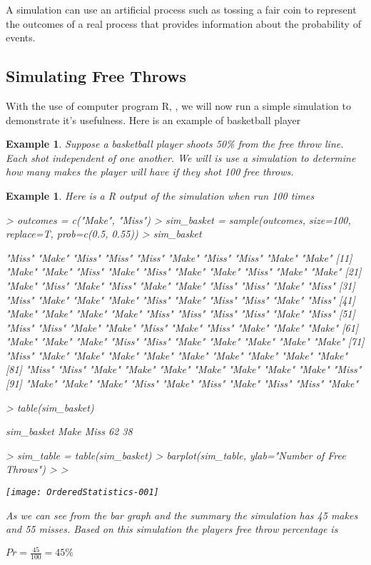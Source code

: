 \documentclass[11pt,a4paper]{article}
\theoremstyle{plain}
\newtheorem{exmp}[fact]{Example}
\begin{document}
A simulation can use an artificial process such as tossing a fair coin to represent the outcomes of a real process that provides information about the probability of events.



\subsection{Simulating Free Throws}
With the use  of computer program R, , we will now run a simple simulation to demonstrate it's usefulness. Here is an example of basketball player



\begin{exmp}
Suppose a basketball player shoots  50\% from the free throw line. Each shot independent of one another. We will is  use a simulation to determine how many makes the player will have if they shot 100 free throws.
\end{exmp}

\begin{exmp}
Here is a R output of the simulation when run 100 times
\begin{Schunk}
\begin{Sinput}
> outcomes = c("Make", "Miss")
> sim_basket = sample(outcomes, size=100, replace=T, prob=c(0.5, 0.55))
> sim_basket
\end{Sinput}
\begin{Soutput}
  [1] "Miss" "Make" "Miss" "Miss" "Miss" "Make" "Miss" "Miss" "Make" "Make"
 [11] "Make" "Make" "Miss" "Make" "Miss" "Make" "Make" "Miss" "Make" "Make"
 [21] "Make" "Miss" "Make" "Miss" "Make" "Make" "Miss" "Miss" "Make" "Miss"
 [31] "Miss" "Make" "Make" "Make" "Miss" "Make" "Miss" "Miss" "Make" "Miss"
 [41] "Make" "Make" "Make" "Make" "Miss" "Miss" "Miss" "Miss" "Make" "Miss"
 [51] "Miss" "Miss" "Make" "Make" "Miss" "Make" "Miss" "Make" "Make" "Make"
 [61] "Make" "Make" "Make" "Miss" "Miss" "Make" "Make" "Make" "Make" "Make"
 [71] "Miss" "Make" "Make" "Make" "Make" "Make" "Make" "Make" "Make" "Make"
 [81] "Miss" "Miss" "Make" "Make" "Make" "Make" "Make" "Make" "Make" "Miss"
 [91] "Make" "Make" "Make" "Miss" "Make" "Miss" "Make" "Miss" "Miss" "Make"
\end{Soutput}
\begin{Sinput}
> table(sim_basket)
\end{Sinput}
\begin{Soutput}
sim_basket
Make Miss 
  62   38 
\end{Soutput}
\begin{Sinput}
> sim_table = table(sim_basket)
> barplot(sim_table, ylab="Number of Free Throws")
> 
> 
\end{Sinput}
\end{Schunk}
\texttt{[image: OrderedStatistics-001]}

As we can see from the bar graph and the summary the simulation has 45 makes and 55 misses. Based on this simulation the players free throw percentage is
\begin{center}
$Pr=\frac{45}{100}=45\%$
\end{center}
\end{exmp}
\end{document}
